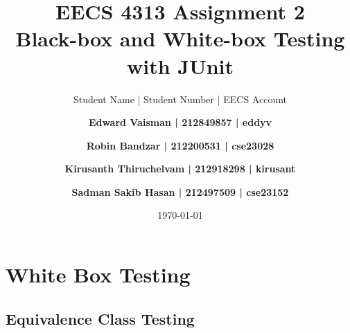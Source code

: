 \documentclass[fontsize=12pt,paper=letter,twoside]{scrartcl}
\author{Student Name | Student Number | EECS Account
\and \textbf{Edward Vaisman | 212849857 | eddyv}
\and \textbf{Robin Bandzar | 212200531 | cse23028}
\and \textbf{Kirusanth Thiruchelvam | 212918298 | kirusant}
\and \textbf{Sadman Sakib Hasan | 212497509 | cse23152}
}
\date{\today} %
\begin{document}
\title{EECS 4313 Assignment 2 \\Black-box and White-box Testing with JUnit}
\maketitle

\newpage

\tableofcontents


\newpage



\section{White Box Testing}

\subsection {Equivalence Class Testing}
\end{document}
